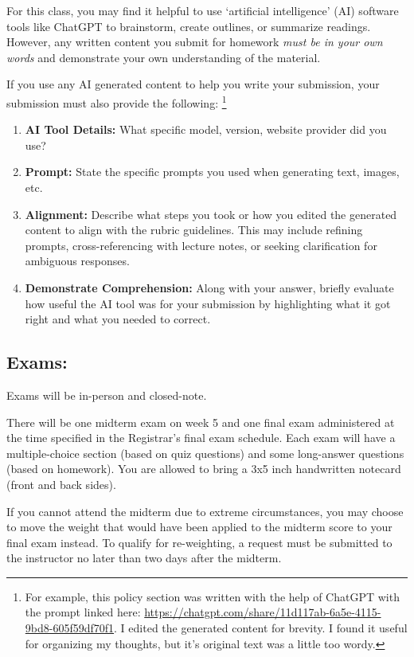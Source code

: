 For this class, you may find it helpful to use `artificial intelligence' (AI) software tools like ChatGPT to brainstorm, create outlines, or summarize readings.
However, any written content you submit for homework \textit{must be in your own words} and demonstrate your own understanding of the material.

If you use any AI generated content to help you write your submission, your submission must also provide the following:
\footnote{For example, this policy section was written with the help of ChatGPT 
with the prompt linked here: \url{https://chatgpt.com/share/11d117ab-6a5e-4115-9bd8-605f59df70f1}.
I edited the generated content for brevity.
I found it useful for organizing my thoughts, but it's original text was a little too wordy.
}
\begin{enumerate}
  \item \textbf{AI Tool Details:} What specific model, version, website provider did you use?
  \item \textbf{Prompt:} State the specific prompts you used when generating text, images, etc. 
  \item \textbf{Alignment:} Describe what steps you took or how you edited the generated content to align with the rubric guidelines.
        This may include refining prompts, cross-referencing with lecture notes, or seeking clarification for ambiguous responses.
  \item \textbf{Demonstrate Comprehension:} Along with your answer, briefly evaluate how useful the AI tool was for your submission by highlighting what it got right and what you needed to correct.
\end{enumerate}


\hypertarget{grade:exam}{\subsection{Exams:}}

Exams will be in-person and closed-note.

There will be one midterm exam on week 5 and one final exam administered at the time specified in the Registrar’s final exam schedule.
Each exam will have a multiple-choice section (based on quiz questions) and some long-answer questions (based on homework).
You are allowed to bring a 3x5 inch handwritten notecard (front and back sides).

If you cannot attend the midterm due to extreme circumstances, you may choose to move the weight that would have been applied to the midterm score to your final exam instead.
To qualify for re-weighting, a request must be submitted to the instructor no later than two days after the midterm.
